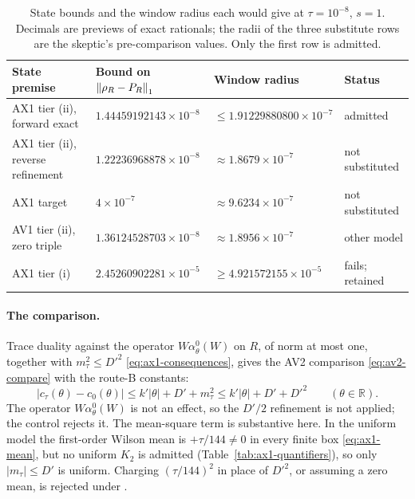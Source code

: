 \begin{table}[htbp]
\centering\small
\caption{State bounds and the window radius each would give at
$\tau=10^{-8}$, $s=1$. Decimals are previews of exact rationals; the radii of
the three substitute rows are the skeptic's pre-comparison values. Only the
first row is admitted.}
\label{tab:ax2-tiers}
\begin{tabularx}{\linewidth}{@{}>{\raggedright\arraybackslash}X lll@{}}
\toprule
State premise & Bound on $\left\lVert\rho_R-P_R\right\rVert_1$ & Window radius & Status\\
\midrule
AX1 tier (ii), forward exact & $1.44459192143\times10^{-8}$ &
$\le1.91229880800\times10^{-7}$ & admitted\\
AX1 tier (ii), reverse refinement & $1.22236968878\times10^{-8}$ &
$\approx1.8679\times10^{-7}$ & not substituted\\
AX1 target & $4\times10^{-7}$ & $\approx9.6234\times10^{-7}$ & not substituted\\
AV1 tier (ii), zero triple & $1.36124528703\times10^{-8}$ &
$\approx1.8956\times10^{-7}$ & other model\\
AX1 tier (i) & $2.45260902281\times10^{-5}$ &
$\ge4.921572155\times10^{-5}$ & fails; retained\\
\bottomrule
\end{tabularx}
\end{table}

\paragraph{The comparison.}
Trace duality against the operator $W\alpha^0_\theta(W)$ on $R$, of norm at
most one, together with $m_\tau^2\le D'^2$ \eqref{eq:ax1-consequences}, gives
the AV2 comparison \eqref{eq:av2-compare} with the route-B constants:
\begin{equation}
 |c_\tau(\theta)-c_0(\theta)|\le k'|\theta|+D'+m_\tau^2\le k'|\theta|+D'+D'^2
 \qquad(\theta\in\mathbb R).
 \label{eq:ax2-compare}
\end{equation}
The operator $W\alpha^0_\theta(W)$ is not an effect, so the $D'/2$ refinement
is not applied; the control  rejects it. The
mean-square term is
substantive here. In the uniform model the first-order Wilson mean is
$+\tau/144\ne0$ in every finite box \eqref{eq:ax1-mean}, but no uniform $K_2$
is admitted (Table~\ref{tab:ax1-quantifiers}), so only $|m_\tau|\le D'$ is
uniform. Charging $(\tau/144)^2$ in place of $D'^2$, or assuming a zero mean,
is rejected under .


